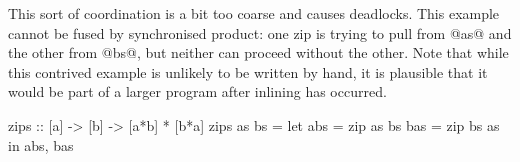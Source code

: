 This sort of coordination is a bit too coarse and causes deadlocks.
This example cannot be fused by synchronised product: one zip is trying to pull from @as@ and the other from @bs@, but neither can proceed without the other.
Note that while this contrived example is unlikely to be written by hand, it is plausible that it would be part of a larger program after inlining has occurred.

\begin{code}
zips :: [a] -> [b] -> [a*b] * [b*a]
zips as bs =
  let abs = zip as bs
      bas = zip bs as
  in  abs, bas
\end{code}


% 
% 
% 
% 
